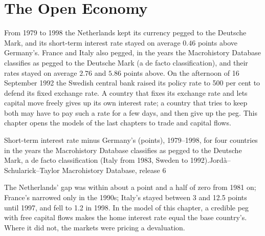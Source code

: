 \chapter{The Open Economy}\label{ch:b1:open-economy}

From 1979 to 1998 the Netherlands kept its currency pegged to the Deutsche
Mark, and its short-term interest rate stayed on average $0.46$ points above
Germany's. France and Italy also pegged, in the years the Macrohistory
Database classifies as pegged to the Deutsche Mark (a de facto
classification), and their rates stayed on average $2.76$ and $5.86$ points
above. %
On the afternoon of 16 September 1992 the Swedish central bank raised its
policy rate to 500 per cent to defend its fixed exchange rate. %
A country that fixes its exchange rate and lets capital move freely gives
up its own interest rate; a country that tries to keep both may have to pay
such a rate for a few days, and then give up the peg. This chapter opens the
models of the last chapters to trade and capital flows.

\begin{openingchart}{Short-term interest rate minus Germany's (points),
1979--1998, for four countries in the years the Macrohistory Database
classifies as pegged to the Deutsche Mark, a de facto classification (Italy
from 1983, Sweden to 1992).}{Jord\`a--Schularick--Taylor Macrohistory Database, release 6}
\end{openingchart}

The Netherlands' gap was within about a point and a half of zero from 1981
on; France's narrowed only in the 1990s; Italy's stayed between 3 and 12.5
points until 1997, and fell to 1.2 in 1998. %
In the model of this chapter, a credible peg with free capital flows makes the
home interest rate equal the base country's. Where it did not, the markets
were pricing a devaluation.

